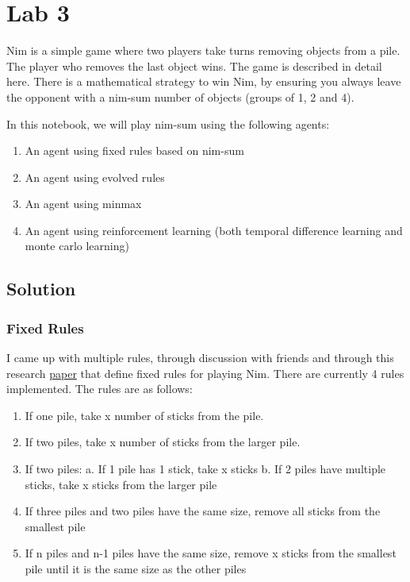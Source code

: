 
\section{Lab 3}

Nim is a simple game where two players take turns removing objects from a pile. The player who removes the last object wins. The game is described in detail here. There is a mathematical strategy to win Nim, by ensuring you always leave the opponent with a nim-sum number of objects (groups of 1, 2 and 4).

In this notebook, we will play nim-sum using the following agents:

\begin{enumerate}
    \item An agent using fixed rules based on nim-sum
    \item An agent using evolved rules
    \item An agent using minmax
    \item An agent using reinforcement learning (both temporal difference learning and monte carlo learning)
\end{enumerate}


\subsection{Solution}

\subsubsection{Fixed Rules}

I came up with multiple rules, through discussion with friends and through this research \href{https://wiki.math.wisc.edu/images/Nim_sol.pdf}{paper} that define fixed rules for playing Nim. There are currently 4 rules implemented. The rules are as follows:

\begin{enumerate}
    \item If one pile, take x number of sticks from the pile.
    \item If two piles, take x number of sticks from the larger pile.
    \item If two piles: a. If 1 pile has 1 stick, take x sticks b. If 2 piles have multiple sticks, take x sticks from the larger pile
    \item If three piles and two piles have the same size, remove all sticks from the smallest pile
    \item If n piles and n-1 piles have the same size, remove x sticks from the smallest pile until it is the same size as the other piles
\end{enumerate}

